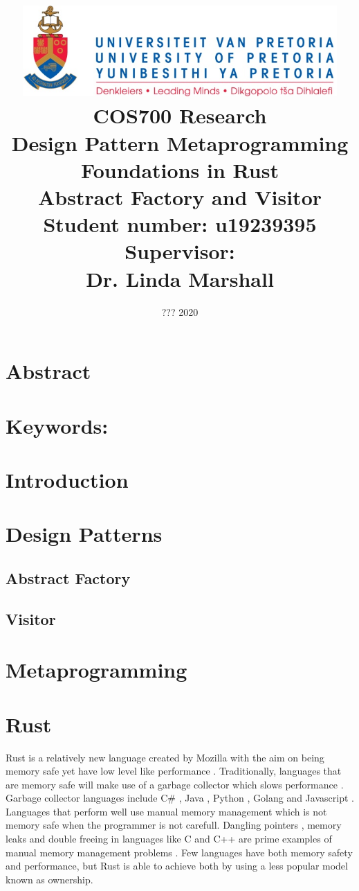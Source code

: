 \documentclass[a4paper,10pt]{article}
\title
{
   \includegraphics[width=12cm]{up_logo.png} \\
   \vspace{2cm}
   \textbf{COS700 Research} \\ \vspace{0.5cm}
   \textbf{Design Pattern Metaprogramming Foundations in Rust\\ \large Abstract Factory and Visitor} \\ \vspace{0.5cm}
   \textbf{Student number:} u19239395 \\ \vspace{0.5cm}
   \textbf{Supervisor}: \\ Dr. Linda Marshall
}
\date{??? 2020}
\begin{document}
\author{}

\maketitle

\newpage
\linespread{1.25}

\section*{Abstract}

\section*{Keywords:}

\newpage

\section{Introduction}

\section{Design Patterns}

\subsection{Abstract Factory}

\subsection{Visitor}

\section{Metaprogramming}

\section{Rust}
Rust is a relatively new language created by Mozilla with the aim on being memory safe yet have low level like performance \cite{klabnik_2019_01}. Traditionally, languages that are memory safe will make use of a garbage collector which slows performance \cite{hertz_05_01}. Garbage collector languages include C\# \cite{robinson_04_01}, Java \cite{gosling_96_01}, Python \cite{martelli_06_01}, Golang \cite{tsoukalos_18_01} and Javascript \cite{flanagan_06_01}. Languages that perform well use manual memory management which is not memory safe when the programmer is not carefull. Dangling pointers \cite{caballero_12_01}, memory leaks \cite{wilson_92_01} and double freeing \cite{sharp_13_01} in languages like C and C++ are prime examples of manual memory management problems \cite{konrad_18_01}. Few languages have both memory safety and performance, but Rust is able to achieve both by using a less popular model known as ownership.
\end{document}
